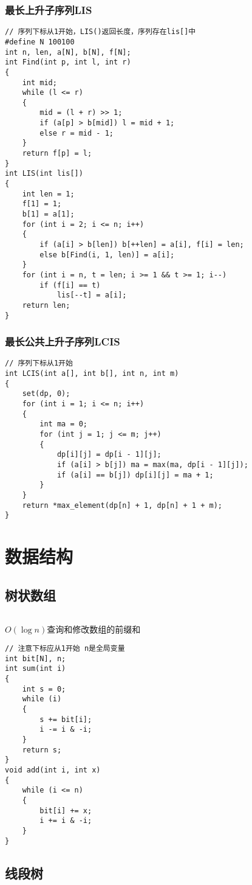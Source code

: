 \documentclass[a4]{article}
\begin{document}
\subsubsection{最长上升子序列LIS}
\begin{lstlisting}
// 序列下标从1开始，LIS()返回长度，序列存在lis[]中
#define N 100100
int n, len, a[N], b[N], f[N];
int Find(int p, int l, int r)
{
    int mid;
    while (l <= r)
    {
        mid = (l + r) >> 1;
        if (a[p] > b[mid]) l = mid + 1;
        else r = mid - 1;
    }
    return f[p] = l;
}
int LIS(int lis[])
{
    int len = 1;
    f[1] = 1;
    b[1] = a[1];
    for (int i = 2; i <= n; i++)
    {
        if (a[i] > b[len]) b[++len] = a[i], f[i] = len;
        else b[Find(i, 1, len)] = a[i];
    }
    for (int i = n, t = len; i >= 1 && t >= 1; i--)
        if (f[i] == t)
            lis[--t] = a[i];
    return len;
}
\end{lstlisting}
\subsubsection{最长公共上升子序列LCIS}
\begin{lstlisting}
// 序列下标从1开始
int LCIS(int a[], int b[], int n, int m)
{
    set(dp, 0);
    for (int i = 1; i <= n; i++)
    {
        int ma = 0;
        for (int j = 1; j <= m; j++)
        {
            dp[i][j] = dp[i - 1][j];
            if (a[i] > b[j]) ma = max(ma, dp[i - 1][j]);
            if (a[i] == b[j]) dp[i][j] = ma + 1;
        }
    }
    return *max_element(dp[n] + 1, dp[n] + 1 + m);
}
\end{lstlisting}
\clearpage\section{数据结构}
\subsection{树状数组}
\begin{lstlisting}
\end{lstlisting}
$O(\log n)$查询和修改数组的前缀和
\begin{lstlisting}
// 注意下标应从1开始 n是全局变量
int bit[N], n;
int sum(int i)
{
    int s = 0;
    while (i)
    {
        s += bit[i];
        i -= i & -i;
    }
    return s;
}
void add(int i, int x)
{
    while (i <= n)
    {
        bit[i] += x;
        i += i & -i;
    }
}
\end{lstlisting}
\subsection{线段树}
\end{document}
